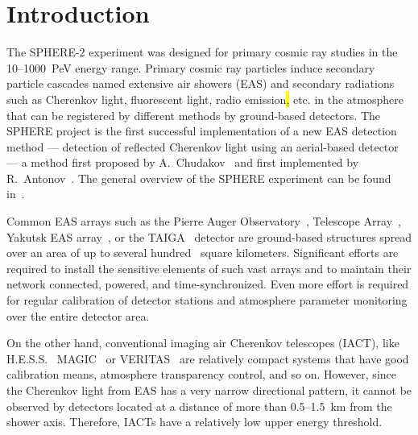 \documentclass[universe,article,submit,moreauthors,pdftex]{Definitions/mdpi}
\newcommand{\highlight}[1]{\colorbox{yellow}{#1}}
\begin{document}



\section{Introduction}
The SPHERE-2 experiment was designed for primary cosmic ray  studies in the 10--1000~PeV energy range. Primary cosmic ray particles induce secondary particle cascades named extensive air showers (EAS) and secondary radiations such as Cherenkov light, fluorescent light, radio emission\highlight{,} etc. in the atmosphere that can be registered by different methods by ground-based detectors. 
The SPHERE project is the first successful implementation of a new EAS detection method --- detection of reflected Cherenkov light using an aerial-based detector --- a method first proposed by A.~Chudakov~\cite{chu74:VKKL74} and first implemented by R.~Antonov~\cite{ant75, ant86, ant97}. The general overview of the SPHERE experiment can be found in~\cite{Ant15a}.

Common EAS arrays such as the Pierre Auger Observatory~\cite{PAO2015, PAO2021}, Telescope Array~\cite{abu12}, Yakutsk EAS array~\cite{Yakutsk19}, or the TAIGA~\cite{TAIGA20} detector are ground-based structures spread over an area of up to several hundred~\cite{abu12} square kilometers. Significant efforts are required to install the sensitive elements of such vast arrays and to maintain their network connected, powered, and time-synchronized. Even more effort is required for regular calibration of detector stations and atmosphere parameter monitoring over the entire detector area. 

On the other hand, conventional imaging air Cherenkov telescopes (IACT), like H.E.S.S.~\cite{HESS03a, HESS2006} %
MAGIC~\cite{MAGIC16-1, MAGIC16-2} or VERITAS~\cite{VERITAS2002, VERITAS2009} are relatively compact systems that have good calibration means, atmosphere transparency control, and so on. However, since the Cherenkov light from EAS has a very narrow directional pattern, it cannot be observed by detectors located at a distance of more than 0.5--1.5~km from the shower axis. Therefore, IACTs have a relatively low upper energy threshold.
\end{document}
